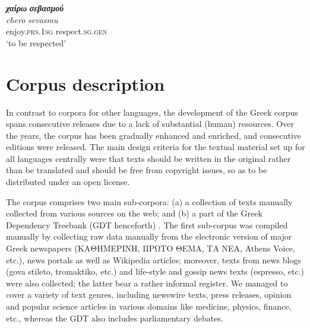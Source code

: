 \documentclass[output=paper,colorlinks,citecolor=brown]{langscibook}
\begin{document}
\ea
\label{ex:chero-ektimisis}
\settowidth {}
\glll
\textbf{\em{χαίρω}} \textbf{\em{σεβασμού}} \\
 \textit{chero} \textit{sevasmu}\\
enjoy.\textsc{prs.1sg} respect.\textsc{sg.gen} \\
\glt ‘to be respected’
\z




\section{Corpus description}
\label{sec:corpus}
In contrast to corpora for other languages, the development of the Greek corpus spans consecutive releases due to a lack of substantial (human) resources. Over the years, the corpus has been gradually enhanced and enriched, and consecutive editions were released. The main design criteria for the textual material \textemdash set up for all languages centrally \textemdash were that texts should be written in the original rather than be translated and should be free from copyright issues, so as to be distributed under an open license. 


The corpus comprises two main sub-corpora: (a) a collection of texts manually collected from various sources on the web; and (b) a part of the Greek Dependency Treebank (GDT henceforth) \citep{prokopidis-papageorgiou-2017}. The first sub-corpus was compiled manually by collecting raw data manually from the electronic version of major Greek newspapers (KAΘΗΜΕΡΙΝΗ, ΠΡΩΤΟ ΘΕΜΑ, ΤΑ ΝΕΑ, Athens Voice, etc.), news portals as well as Wikipedia articles; moreover, texts from news blogs (gova stileto, tromaktiko, etc.) and life-style and gossip news texts (espresso, etc.) were also collected; the latter bear a rather informal register. We managed to cover a variety of text genres, including newswire texts, press releases, opinion and popular science articles in various domains like medicine, physics, finance, etc., whereas the GDT also includes parliamentary debates.
\end{document}
